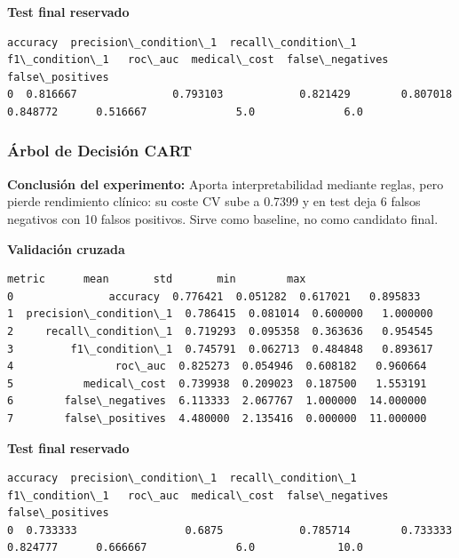 \documentclass[11pt]{article}
\begin{document}
    
    \textbf{Test final reservado}

    
    
    \begin{Verbatim}[commandchars=\\\{\}]
   accuracy  precision\_condition\_1  recall\_condition\_1  f1\_condition\_1   roc\_auc  medical\_cost  false\_negatives  false\_positives
0  0.816667               0.793103            0.821429        0.807018  0.848772      0.516667              5.0              6.0
    \end{Verbatim}

    
    \subsubsection{Árbol de Decisión
CART}\label{uxe1rbol-de-decisiuxf3n-cart}

    
    \textbf{Conclusión del experimento:} Aporta interpretabilidad mediante
reglas, pero pierde rendimiento clínico: su coste CV sube a 0.7399 y en
test deja 6 falsos negativos con 10 falsos positivos. Sirve como
baseline, no como candidato final.

    
    \textbf{Validación cruzada}

    
    
    \begin{Verbatim}[commandchars=\\\{\}]
                  metric      mean       std       min        max
0               accuracy  0.776421  0.051282  0.617021   0.895833
1  precision\_condition\_1  0.786415  0.081014  0.600000   1.000000
2     recall\_condition\_1  0.719293  0.095358  0.363636   0.954545
3         f1\_condition\_1  0.745791  0.062713  0.484848   0.893617
4                roc\_auc  0.825273  0.054946  0.608182   0.960664
5           medical\_cost  0.739938  0.209023  0.187500   1.553191
6        false\_negatives  6.113333  2.067767  1.000000  14.000000
7        false\_positives  4.480000  2.135416  0.000000  11.000000
    \end{Verbatim}

    
    \textbf{Test final reservado}

    
    
    \begin{Verbatim}[commandchars=\\\{\}]
   accuracy  precision\_condition\_1  recall\_condition\_1  f1\_condition\_1   roc\_auc  medical\_cost  false\_negatives  false\_positives
0  0.733333                 0.6875            0.785714        0.733333  0.824777      0.666667              6.0             10.0
    \end{Verbatim}
\end{document}
